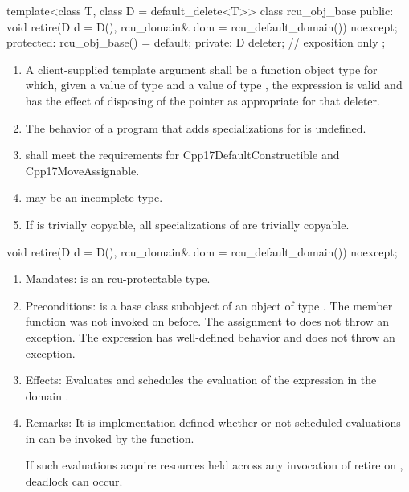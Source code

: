 \begin{codeblock}
template<class T, class D = default_delete<T>>
class rcu_obj_base {
public:
  void retire(D d = D(), rcu_domain& dom = rcu_default_domain()) noexcept;
protected:
  rcu_obj_base() = default;
private:
  D deleter;  // exposition only
};
\end{codeblock}

\begin{enumerate}
\item	A client-supplied template argument  shall be a
	function object type  for which,
	given a value  of type  and a value 
	of type , the expression  is valid and
	has the effect of disposing of the pointer as appropriate for
	that deleter.
\item	The behavior of a program that adds specializations for
	 is undefined.
\item	{} shall meet the requirements for
	Cpp17DefaultConstructible and Cpp17MoveAssignable.
\item	{} may be an incomplete type.
\item	If  is trivially copyable, all specializations of
	 are trivially copyable.
\end{enumerate}

\begin{codeblock}
void retire(D d = D(), rcu_domain& dom = rcu_default_domain()) noexcept;
\end{codeblock}

\begin{enumerate}
\item	Mandates:  is an rcu-protectable type.
\item	Preconditions:  is a base class subobject of
	an object  of type . The member function
	 was not invoked on 
	before. The assignment to  does not throw an
	exception. The expression  has
	well-defined behavior and does not throw an exception.
\item	Effects: Evaluates  and schedules
	the evaluation of the expression 
	in the domain .
\item	Remarks: It is implementation-defined whether or not scheduled
	evaluations in  can be invoked by the 
	function.
	\begin{note}
	If such evaluations acquire resources held across any invocation of
	retire on , deadlock can occur.
	\end{note}
\end{enumerate}

